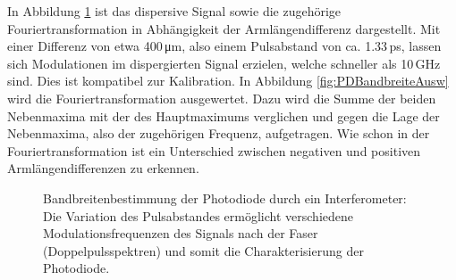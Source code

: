 \documentclass[bachelor,       %
               twoside,        %
               BCOR10mm,       %
               liststotoc,nomtotoc,bibtotoc, %
               english,ngerman, %
               final,          %
               ]{GAUBM}
\begin{document}
In Abbildung \ref{fig:PDBandbreite} ist das dispersive Signal sowie die zugehörige Fouriertransformation in Abhängigkeit der Armlängendifferenz dargestellt.
Mit einer Differenz von etwa 400\,\si{\micro\meter}, also einem Pulsabstand von ca. 1.33\,ps, lassen sich Modulationen im dispergierten Signal erzielen, welche schneller als 10\,GHz sind.
Dies ist kompatibel zur Kalibration.
In Abbildung \ref{fig:PDBandbreiteAusw} wird die Fouriertransformation ausgewertet.
Dazu wird die Summe der beiden Nebenmaxima mit der des Hauptmaximums verglichen und gegen die Lage der Nebenmaxima, also der zugehörigen Frequenz, aufgetragen.
Wie schon in der Fouriertransformation ist ein Unterschied zwischen negativen und positiven Armlängendifferenzen zu erkennen.
\begin{figure}[!htb]
   \centering
   \hfill
   \caption{Bandbreitenbestimmung der Photodiode durch ein Interferometer: Die Variation des Pulsabstandes ermöglicht verschiedene Modulationsfrequenzen des Signals nach der Faser (Doppelpulsspektren) und somit die Charakterisierung der Photodiode.}
   \label{fig:PDBandbreite}
\end{figure}
\end{document}
